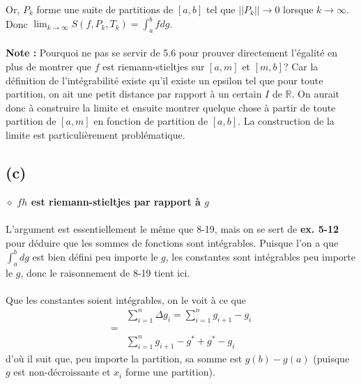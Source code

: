 \documentclass[a4paper,10pt]{article}
\begin{document}
Or, $P_k$ forme une suite de partitions de $[a,b]$ tel que $||P_k|| \rightarrow 0$ lorsque $k \rightarrow \infty$.
Donc $\lim_{k \to \infty} S(f,P_k, T_k) = \int_a^b f dg$.
\\
\\
\textbf{Note :} Pourquoi ne pas se servir de 5.6 pour prouver directement l'égalité en plus de montrer que $f$ est riemann-stieltjes
sur $[a,m]$ et $[m,b]$? Car la définition de l'intégrabilité existe qu'il existe un epsilon tel que pour toute partition, on 
ait une petit distance par rapport à un certain $I$ de $\mathbb{R}$. On aurait donc à construire la limite et ensuite montrer
quelque chose à partir de toute partition de $[a,m]$ en fonction de partition de $[a,b]$. La construction de la limite est particulièrement
problématique.

\subsection*{(c)}
$\diamond$ \textbf{$fh$ est riemann-stieltjes par rapport à $g$}
\\
\\
L'argument est essentiellement le même que 8-19, mais on se sert de \textbf{ex. 5-12} pour 
déduire que les sommes de fonctions sont intégrables. Puisque l'on a que $\int_a^b dg$ est bien défini 
peu importe le $g$, les constantes sont intégrables peu importe le $g$, donc le raisonnement de 8-19 tient ici.
\\
\\
Que les constantes soient intégrables, on le voit à ce que 
\begin{align*}
 & \sum_{i=1}^n \Delta g_i = \sum_{i=1}^n g_{i+1} - g_i \\
 = \\
 & \sum_{i=1}^n g_{i+1} - g^* + g^* - g_i
\end{align*}
d'où il suit que, peu importe la partition, sa somme est $g(b) - g(a)$ (puisque $g$ est non-décroissante et $x_i$ forme une partition).
\end{document}
